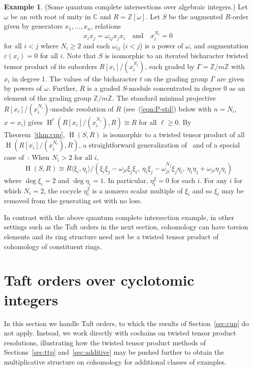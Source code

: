 \documentclass[11pt]{amsart}
\numberwithin{equation}{section}
\theoremstyle{definition}
\newtheorem{example}[equation]{Example}
\theoremstyle{remark}
\newcommand{\C}{\mathbb{C}}
\newcommand{\Z}{\mathbb{Z}}
\newcommand\Homol{\operatorname{H}}
\newcommand\coh{\Homol}
\begin{document}
\begin{example}
(Some quantum complete intersections over algebraic integers.)
Let $\omega$ be an $m$th root of unity in $\C$ and $R = \Z[\omega]$.
Let $S$ be the augmented $R$-order given by generators $x_1,\ldots,x_n$, 
relations
\[
    x_ix_j = \omega_{ij} x_jx_i \ \ \ \mbox{ and } \ \ \
    x_i^{N_i} = 0
\]
for all $i < j$ where $N_i\geq 2$ and each $\omega_{ij}$ ($i < j$) is a power of $\omega$, 
and augmentation $\varepsilon(x_i) = 0$ for all $i$.
Note that $S$ is isomorphic to an iterated bicharacter twisted tensor
product of its suborders $R[x_i]/(x_i^{N_i})$, each
graded by $\Gamma = \Z/m\Z$ with $x_i$ in degree 1.
The values of the bicharacter $t$ on the grading group $\Gamma$ 
are given by powers of $\omega$. 
Further, $R$ is a graded $S$-module
concentrated in degree 0 as an element of the grading group $\Z/m\Z$. 
The standard minimal projective $R[x_i]/(x_i^{N_i})$-module resolution of $R$ 
(see~(\ref{eqn:P-std}) below with $n=N_i$, $x = x_i$) 
gives $\coh^{\ell}(R[x_i]/(x_i^{N_i}),R)\cong R$ for all $\ell \geq 0$.
By Theorem~\ref{thm:cup}, $\coh(S,R)$ is isomorphic to a twisted
tensor product of all $\coh(R[x_i]/(x_i^{N_i}), R)$, a straightforward
generalization of~\cite[Theorem 4.1]{MPSW} and of a special case
of~\cite[Theorem 5.3]{BO}:
When $N_i >2$ for all $i$,
\[
  \coh (S,R) \cong R\langle\xi_i, \eta_i \rangle /
   (\xi_i\xi_j - \omega_{ji}\xi_j\xi_i , \ 
    \eta_i\xi_j - \omega_{ji}^{N_j} \xi_j\eta_i , \
   \eta_i \eta_j + \omega_{ji}\eta_j\eta_i )
\]
where $\deg \xi_i = 2$ and $\deg \eta_i = 1$.
In particular, $\eta_i^2 = 0$ for each $i$.
For any $i$ for which $N_i = 2$, the cocycle $\eta_i^2$ is a nonzero scalar multiple of
$\xi_i$ and so $\xi_i$ may be removed from the generating set with no loss. 
\end{example}


In contrast with the above quantum complete intersection example,
in other settings such as the Taft orders in
the next section,
cohomology can have torsion elements and its ring structure
need not be a twisted tensor product of cohomology of constituent rings. 




\section{Taft orders over cyclotomic integers}\label{sec:Taft}

In this section we handle Taft orders,
to which the results of Section~\ref{sec:cup} do not apply.
Instead, we work directly with cochains on twisted tensor product resolutions, 
illustrating how the twisted tensor product methods
of Sections~\ref{sec:ttp} and~\ref{sec:additive}
may be pushed further to obtain the multiplicative structure on cohomology
for additional classes of examples. 
\end{document}
